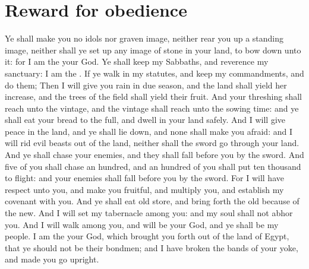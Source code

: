 \section*{Reward for obedience}
\begin{biblechapter} %
\verse Ye shall make you no idols nor graven image, neither rear you up a standing image, neither shall ye set up any image of stone in your land, to bow down unto it: for I am the \LORD your God.
\verse Ye shall keep my Sabbaths, and reverence my sanctuary: I am the \LORD.
\verse If ye walk in my statutes, and keep my commandments, and do them;
\verse Then I will give you rain in due season, and the land shall yield her increase, and the trees of the field shall yield their fruit.
\verse And your threshing shall reach unto the vintage, and the vintage shall reach unto the sowing time: and ye shall eat your bread to the full, and dwell in your land safely.
\verse And I will give peace in the land, and ye shall lie down, and none shall make you afraid: and I will rid evil beasts out of the land, neither shall the sword go through your land.
\verse And ye shall chase your enemies, and they shall fall before you by the sword.
\verse And five of you shall chase an hundred, and an hundred of you shall put ten thousand to flight: and your enemies shall fall before you by the sword.
\verse For I will have respect unto you, and make you fruitful, and multiply you, and establish my covenant with you.
\verse And ye shall eat old store, and bring forth the old because of the new.
\verse And I will set my tabernacle among you: and my soul shall not abhor you.
\verse And I will walk among you, and will be your God, and ye shall be my people.
\verse I am the \LORD your God, which brought you forth out of the land of Egypt, that ye should not be their bondmen; and I have broken the bands of your yoke, and made you go upright.

\end{biblechapter}
